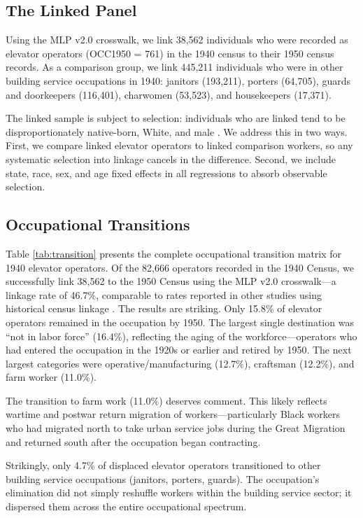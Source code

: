 \documentclass[12pt]{article}
\begin{document}
\subsection{The Linked Panel}

Using the MLP v2.0 crosswalk, we link 38,562 individuals who were recorded as elevator operators (OCC1950 = 761) in the 1940 census to their 1950 census records. As a comparison group, we link 445,211 individuals who were in other building service occupations in 1940: janitors (193,211), porters (64,705), guards and doorkeepers (116,401), charwomen (53,523), and housekeepers (17,371).

The linked sample is subject to selection: individuals who are linked tend to be disproportionately native-born, White, and male \citep{abramitzky2021}. We address this in two ways. First, we compare linked elevator operators to linked comparison workers, so any systematic selection into linkage cancels in the difference. Second, we include state, race, sex, and age fixed effects in all regressions to absorb observable selection.

\subsection{Occupational Transitions}

Table \ref{tab:transition} presents the complete occupational transition matrix for 1940 elevator operators. Of the 82,666 operators recorded in the 1940 Census, we successfully link 38,562 to the 1950 Census using the MLP v2.0 crosswalk---a linkage rate of 46.7\%, comparable to rates reported in other studies using historical census linkage \citep{abramitzky2012, abramitzky2021}. The results are striking. Only 15.8\% of elevator operators remained in the occupation by 1950. The largest single destination was ``not in labor force'' (16.4\%), reflecting the aging of the workforce---operators who had entered the occupation in the 1920s or earlier and retired by 1950. The next largest categories were operative/manufacturing (12.7\%), craftsman (12.2\%), and farm worker (11.0\%).

The transition to farm work (11.0\%) deserves comment. This likely reflects wartime and postwar return migration of workers---particularly Black workers who had migrated north to take urban service jobs during the Great Migration and returned south after the occupation began contracting.

Strikingly, only 4.7\% of displaced elevator operators transitioned to other building service occupations (janitors, porters, guards). The occupation's elimination did not simply reshuffle workers within the building service sector; it dispersed them across the entire occupational spectrum.
\end{document}
